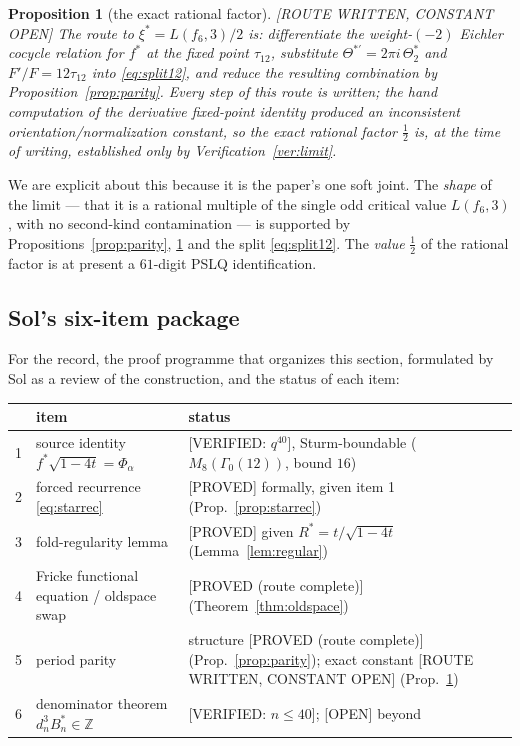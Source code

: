 \documentclass[11pt,reqno]{amsart}
\theoremstyle{plain}
\newtheorem{proposition}[theorem]{Proposition}
\theoremstyle{definition}
\theoremstyle{remark}
\newcommand{\Z}{\mathbb{Z}}
\newcommand{\fs}{f^{*}}
\newcommand{\Proved}{\textup{\textsf{[PROVED]}}}
\newcommand{\ProvedS}{\textup{\textsf{[PROVED (route complete)]}}}
\newcommand{\VerifiedR}[1]{\textup{\textsf{[VERIFIED: #1]}}}
\newcommand{\Open}{\textup{\textsf{[OPEN]}}}
\newcommand{\RouteOpen}{\textup{\textsf{[ROUTE WRITTEN, CONSTANT OPEN]}}}
\begin{document}
\begin{proposition}[the exact rational factor]\label{prop:half}
\RouteOpen{} The route to $\xi^*=L(f_6,3)/2$ is: differentiate the
weight-$(-2)$ Eichler cocycle relation for $\fs$ at the fixed point
$\tau_{12}$, substitute $\Theta^{*\prime}=2\pi i\,\Theta^*_2$ and
$F'/F=12\tau_{12}$ into \eqref{eq:split12}, and reduce the resulting
combination by Proposition~\ref{prop:parity}. Every step of this route is
written; the hand computation of the derivative fixed-point identity
produced an inconsistent orientation/normalization constant, so the exact
rational factor $\tfrac12$ is, at the time of writing, established only by
Verification~\ref{ver:limit}.
\end{proposition}

We are explicit about this because it is the paper's one soft joint. The
\emph{shape} of the limit --- that it is a rational multiple of the single
odd critical value $L(f_6,3)$, with no second-kind contamination --- is
supported by Propositions~\ref{prop:parity}, \ref{prop:half} and the split
\eqref{eq:split12}. The \emph{value} $\tfrac12$ of the rational factor is
at present a $61$-digit PSLQ identification.

\subsection{Sol's six-item package}
For the record, the proof programme that organizes this section, formulated
by Sol as a review of the construction, and the status of each item:

\begin{center}
\begin{tabular}{@{}rlp{6.9cm}@{}}
\toprule
& item & status \\
\midrule
1 & source identity $\fs\sqrt{1-4t}=\Phi_\alpha$ &
\VerifiedR{$q^{40}$}, Sturm-boundable ($M_8(\Gamma_0(12))$, bound $16$) \\
2 & forced recurrence \eqref{eq:starrec} &
\Proved{} formally, given item 1 (Prop.~\ref{prop:starrec}) \\
3 & fold-regularity lemma &
\Proved{} given $R^*=t/\sqrt{1-4t}$ (Lemma~\ref{lem:regular}) \\
4 & Fricke functional equation / oldspace swap &
\ProvedS{} (Theorem~\ref{thm:oldspace}) \\
5 & period parity &
structure \ProvedS{} (Prop.~\ref{prop:parity}); exact constant \RouteOpen{}
(Prop.~\ref{prop:half}) \\
6 & denominator theorem $d_n^3B^*_n\in\Z$ &
\VerifiedR{$n\le40$}; \Open{} beyond \\
\bottomrule
\end{tabular}
\end{center}
\end{document}
